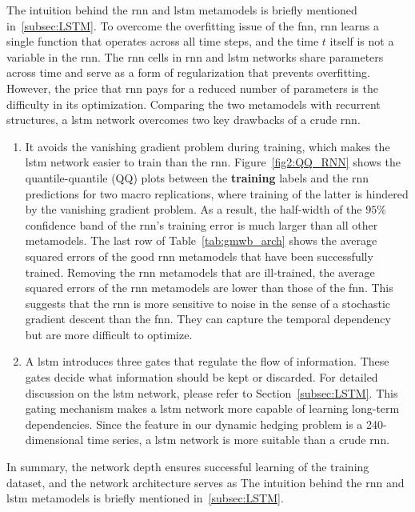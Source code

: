 The intuition behind the \gls{rnn} and \gls{lstm} metamodels is briefly mentioned in~\ref{subsec:LSTM}.
To overcome the overfitting issue of the \gls{fnn}, \gls{rnn} learns a single function that operates across all time steps, and the time $t$ itself is not a variable in the \gls{rnn}.
The \gls{rnn} cells in \gls{rnn} and \gls{lstm} networks share parameters across time and serve as a form of regularization that prevents overfitting.
However, the price that \gls{rnn} pays for a reduced number of parameters is the difficulty in its optimization.
Comparing the two metamodels with recurrent structures, a \gls{lstm} network overcomes two key drawbacks of a crude \gls{rnn}.
\begin{enumerate}
    \item It avoids the vanishing gradient problem during training, which makes the \gls{lstm} network easier to train than the \gls{rnn}. Figure~\ref{fig2:QQ_RNN} shows the quantile-quantile (QQ) plots between the \textbf{training} labels and the \gls{rnn} predictions for two macro replications, where training of the latter is hindered by the vanishing gradient problem. 
    As a result, the half-width of the $95\%$ confidence band of the \gls{rnn}'s training error is much larger than all other metamodels. 
    The last row of Table~\ref{tab:gmwb_arch} shows the average squared errors of the good \gls{rnn} metamodels that have been successfully trained. 
    Removing the \gls{rnn} metamodels that are ill-trained, the average squared errors of the \gls{rnn} metamodels are lower than those of the \gls{fnn}.
    This suggests that the \gls{rnn} is more sensitive to noise in the sense of a stochastic gradient descent than the \gls{fnn}.
    They can capture the temporal dependency but are more difficult to optimize.
    \item A \gls{lstm} introduces three gates that regulate the flow of information. 
    These gates decide what information should be kept or discarded.
    For detailed discussion on the \gls{lstm} network, please refer to Section~\ref{subsec:LSTM}.
    This gating mechanism makes a \gls{lstm} network more capable of learning long-term dependencies. 
    Since the feature in our dynamic hedging problem is a 240-dimensional time series, a \gls{lstm} network is more suitable than a crude \gls{rnn}.
\end{enumerate}
In summary, the network depth ensures successful learning of the training dataset, and the network architecture serves as 
The intuition behind the \gls{rnn} and \gls{lstm} metamodels is briefly mentioned in~\ref{subsec:LSTM}.
